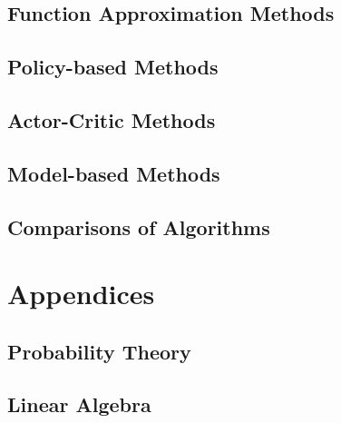 \documentclass{report}
\begin{document}
    \chapter{Function Approximation Methods}
    
    \chapter{Policy-based Methods}
    
    \chapter{Actor-Critic Methods}
    
    \chapter{Model-based Methods}
    \chapter{Comparisons of Algorithms}
\part{Appendices}
    \chapter{Probability Theory}\label{ch:Prob}
    
    \chapter{Linear Algebra}
    
\printbibliography
\end{document}
